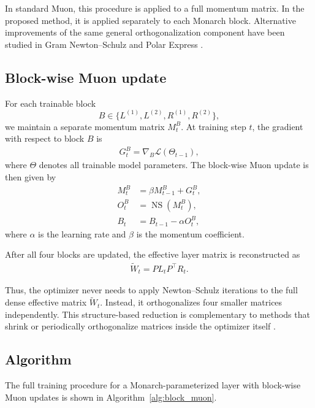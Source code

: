 \documentclass{article}
\begin{document}
In standard Muon, this procedure is applied to a full momentum matrix. In the proposed method, it is applied separately to each Monarch block. Alternative improvements of the same general orthogonalization component have been studied in Gram Newton--Schulz and Polar Express \cite{GramNewtonSchulz,amsel2026polarexpressoptimalmatrix}.

\subsection{Block-wise Muon update}

For each trainable block
\[
B \in \{L^{(1)}, L^{(2)}, R^{(1)}, R^{(2)}\},
\]
we maintain a separate momentum matrix \(M^B_t\). At training step \(t\), the gradient with respect to block \(B\) is
\begin{align}
G_t^B = \nabla_B \mathcal{L}(\Theta_{t-1}),
\end{align}
where \(\Theta\) denotes all trainable model parameters. The block-wise Muon update is then given by
\begin{align}
M_t^B &= \beta M_{t-1}^B + G_t^B, \\
O_t^B &= \operatorname{NS}(M_t^B), \\
B_t &= B_{t-1} - \alpha O_t^B,
\end{align}
where \(\alpha\) is the learning rate and \(\beta\) is the momentum coefficient.

After all four blocks are updated, the effective layer matrix is reconstructed as
\begin{align}
\widetilde{W}_t = P L_t P^\top R_t.
\end{align}

Thus, the optimizer never needs to apply Newton--Schulz iterations to the full dense effective matrix \(\widetilde{W}_t\). Instead, it orthogonalizes four smaller matrices independently. This structure-based reduction is complementary to methods that shrink or periodically orthogonalize matrices inside the optimizer itself \cite{ahn2025dion2simplemethodshrink,khaled2025muonbpfastermuonblockperiodic}.

\subsection{Algorithm}

The full training procedure for a Monarch-parameterized layer with block-wise Muon updates is shown in Algorithm~\ref{alg:block_muon}.
\end{document}

